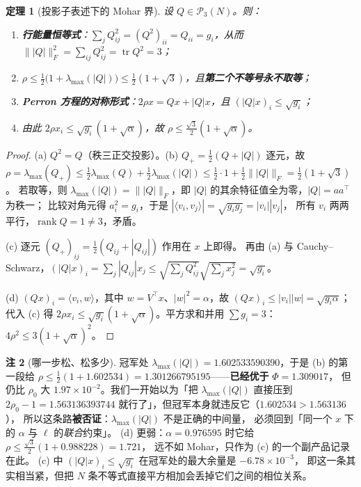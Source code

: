 \documentclass[UTF8,11pt]{ctexart}
\newtheorem{theorem}{定理}[section]
\theoremstyle{definition}
\newtheorem{remark}[theorem]{注}
\newcommand{\tr}{\operatorname{tr}}
\newcommand{\rank}{\operatorname{rank}}
\begin{document}
\begin{theorem}[投影子表述下的 Mohar 界]\label{thm:projmohar}
设 $Q\in\mathcal P_3(N)$。则：
\begin{enumerate}[label=(\alph*),leftmargin=2.2em]
\item \textbf{行能量恒等式}：$\sum_jQ_{ij}^2=(Q^2)_{ii}=Q_{ii}=g_i$，从而 $\bigl\||Q|\bigr\|_F^2=\sum_{ij}Q_{ij}^2=\tr Q^2=3$；
\item $\rho\le\frac12\bigl(1+\lambda_{\max}(|Q|)\bigr)\le\frac12(1+\sqrt3)$，且\textbf{第二个不等号永不取等}；
\item \textbf{Perron 方程的对称形式}：$2\rho x=Qx+|Q|x$，且 $(|Q|x)_i\le\sqrt{g_i}$；
\item 由此 $2\rho x_i\le\sqrt{g_i}(1+\sqrt\alpha)$，故 $\rho\le\frac{\sqrt3}2(1+\sqrt\alpha)$。
\end{enumerate}
\end{theorem}

\begin{proof}
(a) $Q^2=Q$（秩三正交投影）。(b) $Q_+=\frac12(Q+|Q|)$ 逐元，故
$\rho=\lambda_{\max}(Q_+)\le\frac12\lambda_{\max}(Q)+\frac12\lambda_{\max}(|Q|)
\le\frac12\cdot1+\frac12\bigl\||Q|\bigr\|_F=\frac12(1+\sqrt3)$。
若取等，则 $\lambda_{\max}(|Q|)=\||Q|\|_F$，即 $|Q|$ 的其余特征值全为零，$|Q|=aa^\top$ 为秩一；
比较对角元得 $a_i^2=g_i$，于是 $|\langle v_i,v_j\rangle|=\sqrt{g_ig_j}=|v_i||v_j|$，
所有 $v_i$ 两两平行，$\rank Q=1\ne3$，矛盾。

(c) 逐元 $(Q_+)_{ij}=\frac12(Q_{ij}+|Q_{ij}|)$ 作用在 $x$ 上即得。
再由 (a) 与 Cauchy--Schwarz，$(|Q|x)_i=\sum_j|Q_{ij}|x_j\le\sqrt{\sum_jQ_{ij}^2}\sqrt{\sum_jx_j^2}=\sqrt{g_i}$。

(d) $(Qx)_i=\langle v_i,w\rangle$，其中 $w=V^\top x$、$|w|^2=\alpha$，故
$(Qx)_i\le|v_i||w|=\sqrt{g_i\alpha}$；代入 (c) 得
$2\rho x_i\le\sqrt{g_i}(1+\sqrt\alpha)$。平方求和并用 $\sum g_i=3$：
$4\rho^2\le3(1+\sqrt\alpha)^2$。
\end{proof}

\begin{remark}[哪一步松、松多少]\label{rmk:projmoharslack}
冠军处 $\lambda_{\max}(|Q|)=1.602533590390$，于是 (b) 的第一段给
$\rho\le\frac12(1+1.602534)=1.301266795195$——\textbf{已经优于} $\Phi=1.309017$，
但仍比 $\rho_0$ 大 $1.97\times10^{-2}$。我们一开始以为「把 $\lambda_{\max}(|Q|)$ 直接压到
$2\rho_0-1=1.563136393744$ 就行了」，但冠军本身就违反它（$1.602534>1.563136$），
所以这条路\textbf{被否证}：$\lambda_{\max}(|Q|)$ 不是正确的中间量，
必须回到「同一个 $x$ 下的 $\alpha$ 与 $\ell$ 的\emph{联合}约束」。
(d) 更弱：$\alpha=0.976595$ 时它给 $\rho\le\frac{\sqrt3}2(1+0.988228)=1.721$，
远不如 Mohar，只作为 (c) 的一个副产品记录在此。
(c) 中 $(|Q|x)_i\le\sqrt{g_i}$ 在冠军处的最大余量是 $-6.78\times10^{-3}$，
即这一条其实相当紧，但把 $N$ 条不等式直接平方相加会丢掉它们之间的相位关系。
\end{remark}
\end{document}
